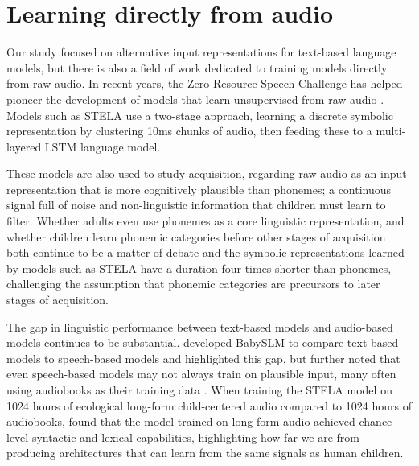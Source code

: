 \section{Learning directly from audio}
\label{sec:17-audiomodels}

Our study focused on alternative input representations for text-based language models, but there is also a field of work dedicated to training models directly from raw audio.
In recent years, the Zero Resource Speech Challenge has helped pioneer the development of models that learn unsupervised from raw audio \citep{dunbar_self-supervised_2022}. Models such as STELA \citep{schatz2021early, lavechin2022can} use a two-stage approach, learning a discrete symbolic representation by clustering 10ms chunks of audio, then feeding these to a multi-layered LSTM language model.

These models are also used to study acquisition, regarding raw audio as an input representation that is more cognitively plausible than phonemes; a continuous signal full of noise and non-linguistic information that children must learn to filter. Whether adults even use phonemes as a core linguistic representation, and whether children learn phonemic categories before other stages of acquisition both continue to be a matter of debate \citep{kazanina2018phonemes, matusevych2023infant} and the symbolic representations learned by models such as STELA have a duration four times shorter than phonemes, challenging the assumption that phonemic categories are precursors to later stages of acquisition. 

The gap in linguistic performance between text-based models and audio-based models continues to be substantial. \citet{lavechin} developed BabySLM to compare text-based models to speech-based models and highlighted this gap, but further noted that even speech-based models may not always train on plausible input, many often using audiobooks as their training data \citep{Kahn_2020}. When training the STELA model on 1024 hours of ecological long-form child-centered audio compared to 1024 hours of audiobooks, \citet{lavechin} found that the model trained on long-form audio achieved chance-level syntactic and lexical capabilities, highlighting how far we are from producing architectures that can learn from the same signals as human children.



